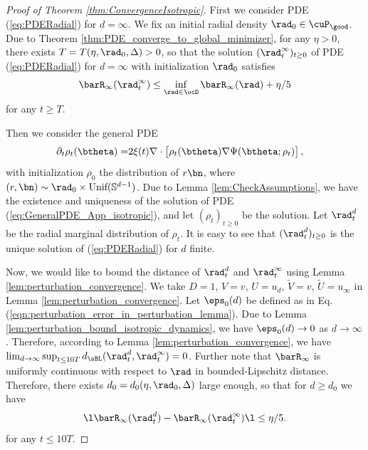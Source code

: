 \documentclass[11pt]{article}
\begin{document}
\begin{proof}[Proof of Theorem \ref{thm:ConvergenceIsotropic}]

First we consider PDE (\ref{eq:PDERadial}) for $d = \infty$. We fix an initial radial density $\rad_0 \in \cuP_{\good}$. Due to Theorem \ref{thm:PDE_converge_to_global_minimizer}, for any $\eta > 0$, there exists $T = T(\eta, \rad_0, \Delta) > 0$, so that the solution $(\rad_t^\infty)_{t \ge 0}$ of PDE (\ref{eq:PDERadial}) for $d = \infty$ with initialization $\rad_0$ satisfies
\[
\barR_\infty(\rad_t^\infty) \le \inf_{\rad \in \ocD}\barR_\infty(\rad) + \eta / 5
\]
for any $t \ge T$. 


Then we consider the general PDE
\begin{align}
%
\partial_t\rho_t(\btheta) =& 2 \xi(t) \nabla\cdot \big[\rho_t(\btheta)\nabla\Psi(\btheta;\rho_t)\big]\,, \label{eq:GeneralPDE_App_isotropic}
%
\end{align}
with initialization $\rho_0$ the distribution of $r\bn$, where $(r, \bn) \sim \rad_0 \times \text{Unif}(\mathbb S^{d - 1})$. Due to Lemma \ref{lem:CheckAssumptions}, we have the existence and uniqueness of the solution of PDE (\ref{eq:GeneralPDE_App_isotropic}), and let $(\rho_t)_{t \ge 0}$ be the solution. Let $\rad_t^d$ be the radial marginal distribution of $\rho_t$. It is easy to see that $(\rad_t^d)_{t \ge 0}$ is the unique solution of (\ref{eq:PDERadial}) for $d$ finite.

Now, we would like to bound the distance of $\rad_t^d$ and $\rad_t^\infty$ using Lemma \ref{lem:perturbation_convergence}. We take $D = 1$, $V = v$, $U = u_d$, $\tilde V = v$, $\tilde U = u_\infty$ in Lemma \ref{lem:perturbation_convergence}.  Let $\eps_0(d)$ be defined as in Eq. (\ref{eqn:perturbation_error_in_perturbation_lemma}). Due to Lemma \ref{lem:perturbation_bound_isotropic_dynamics}, we have $\eps_0(d) \rightarrow 0$ as $d \rightarrow \infty$. Therefore, according to Lemma \ref{lem:perturbation_convergence}, we have $\lim_{d \to \infty} \sup_{t \le 10 T}d_{\sBL}(\rad_t^{d}, \rad_t^{\infty}) = 0$. Further note that $\barR_\infty$ is uniformly continuous with respect to $\rad$ in bounded-Lipschitz distance. Therefore, there exists $d_0 = d_0 (\eta, \rad_0, \Delta)$ large enough, so that for $d \ge d_0$ we have
\[
\l \barR_\infty(\rad_t^d) - \barR_\infty(\rad_t^\infty) \l \le \eta / 5.
\]
for any $t \le 10T$. 


\end{proof}
\end{document}
